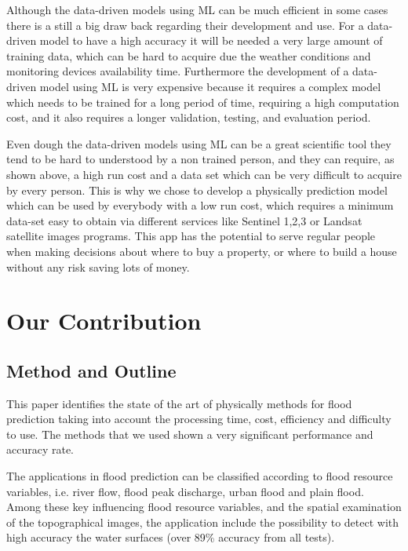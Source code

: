 \documentclass[12pt, a4paper]{report}
\begin{document}
Although the data-driven models using ML can be much efficient in some cases there is a still a big draw back regarding their development and use. For a data-driven model to have a high accuracy it will be needed a very large amount of training data, which can be hard to acquire due the weather conditions and monitoring devices availability time. Furthermore the development of a data-driven model using ML is very expensive because it requires a complex model which needs to be trained for a long period of time, requiring a high computation cost, and it also requires a longer validation, testing, and evaluation period.
\par

Even dough the data-driven models using ML can be a great scientific tool they tend to be hard to understood by a non trained person, and they can require, as shown above, a high run cost and a data set which can be very difficult to acquire by every person. This is why we chose to develop a physically prediction model which can be used by everybody with a low run cost, which requires a minimum data-set easy to obtain via different services like Sentinel 1,2,3 or Landsat satellite images programs. This app has the potential to serve regular people when making decisions about where to buy a property, or where to build a house without any risk saving lots of money.
\par


\section{Our Contribution}
\subsection{Method and Outline}

\quad
This paper identifies the state of the art of physically methods for flood prediction taking into account the processing time, cost, efficiency and difficulty to use. The methods that we used shown a very significant performance and accuracy rate.
\par

The applications in flood prediction can be classified according to flood resource variables, i.e. river flow, flood peak discharge, urban flood and plain flood. Among these key influencing flood resource variables, and the spatial examination of the topographical images, the application include the possibility to detect with high accuracy the water surfaces (over 89\% accuracy from all tests).
\par
\end{document}
